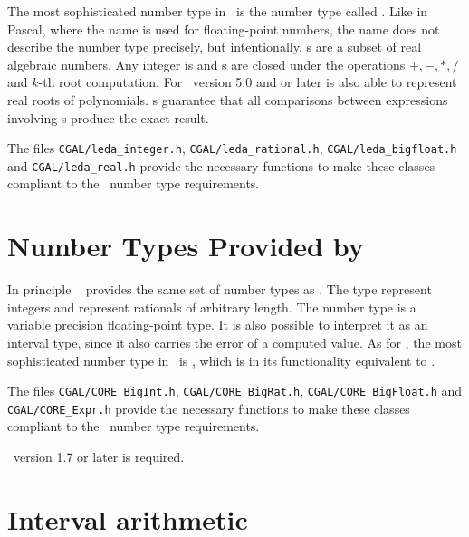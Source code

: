 The most sophisticated number type in \leda\ is the number type called
. Like in Pascal, where the name  is used for
floating-point numbers, the name  does not describe the
number type precisely, but intentionally.  
s are a subset of real algebraic
numbers.  Any integer is  and s are closed under
the operations $+,-,*,/$ and $k$-th root computation. For \leda\ version 5.0 and
or later  is also able to represent real roots of polynomials.  
s guarantee that
all comparisons between expressions involving s produce the
exact result.

The files {\tt CGAL/leda\_integer.h}, {\tt CGAL/leda\_rational.h},
{ \tt CGAL/leda\_bigfloat.h} and {\tt CGAL/leda\_real.h} provide the
necessary functions to make these classes compliant to the \cgal\ number type
requirements.

\section[Number Types Provided by CORE]{Number Types Provided by \core}
\label{core-nt}

In principle \core~\cite{klpy-clp-99} provides the same set of number types as \leda. 
The type  represent integers and  
represent rationals of arbitrary length. The number type  is 
a variable precision floating-point type. It is also possible to interpret it as an
interval type, since it also carries the error of a computed value.
As for \leda, the most sophisticated number type in \core\ is , 
which is in its functionality equivalent to .  

The files {\tt CGAL/CORE\_BigInt.h}, {\tt CGAL/CORE\_BigRat.h},
{\tt CGAL/CORE\_BigFloat.h} and {\tt CGAL/CORE\_Expr.h} provide the
necessary functions to make these classes compliant to the \cgal\ number type
requirements.

\core\ version 1.7 or later is required.

\section[Interval arithmetic]
{Interval arithmetic}

